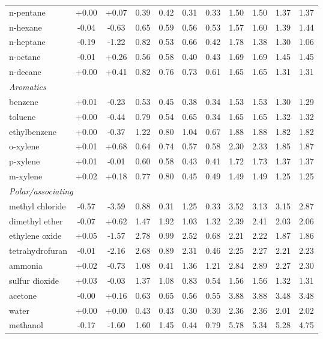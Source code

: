\begin{table}[H]
\begin{tabular}{lcccccccccc}
n-pentane & +0.00 & +0.07 & 0.39 & 0.42 & 0.31 & 0.33 & 1.50 & 1.50 & 1.37 & 1.37 \\
n-hexane & -0.04 & -0.63 & 0.65 & 0.59 & 0.56 & 0.53 & 1.57 & 1.60 & 1.39 & 1.44 \\
n-heptane & -0.19 & -1.22 & 0.82 & 0.53 & 0.66 & 0.42 & 1.78 & 1.38 & 1.30 & 1.06 \\
n-octane & -0.01 & +0.26 & 0.56 & 0.58 & 0.40 & 0.43 & 1.69 & 1.69 & 1.45 & 1.45 \\
n-decane & +0.00 & +0.41 & 0.82 & 0.76 & 0.73 & 0.61 & 1.65 & 1.65 & 1.31 & 1.31 \\
\multicolumn{11}{l}{\emph{Aromatics}} \\
benzene & +0.01 & -0.23 & 0.53 & 0.45 & 0.38 & 0.34 & 1.53 & 1.53 & 1.30 & 1.29 \\
toluene & +0.00 & -0.44 & 0.79 & 0.54 & 0.65 & 0.34 & 1.65 & 1.65 & 1.32 & 1.32 \\
ethylbenzene & +0.00 & -0.37 & 1.22 & 0.80 & 1.04 & 0.67 & 1.88 & 1.88 & 1.82 & 1.82 \\
o-xylene & +0.01 & +0.68 & 0.64 & 0.74 & 0.57 & 0.58 & 2.30 & 2.33 & 1.85 & 1.87 \\
p-xylene & +0.01 & -0.01 & 0.60 & 0.58 & 0.43 & 0.41 & 1.72 & 1.73 & 1.37 & 1.37 \\
m-xylene & +0.02 & +0.18 & 0.77 & 0.80 & 0.45 & 0.49 & 1.49 & 1.49 & 1.25 & 1.25 \\
\multicolumn{11}{l}{\emph{Polar/associating}} \\
methyl chloride & -0.57 & -3.59 & 0.88 & 0.31 & 1.25 & 0.33 & 3.52 & 3.13 & 3.15 & 2.87 \\
dimethyl ether & -0.07 & +0.62 & 1.47 & 1.92 & 1.03 & 1.32 & 2.39 & 2.41 & 2.03 & 2.06 \\
ethylene oxide & +0.05 & -1.57 & 2.78 & 0.99 & 2.52 & 0.68 & 2.21 & 2.22 & 1.87 & 1.86 \\
tetrahydrofuran & -0.01 & -2.16 & 2.68 & 0.89 & 2.31 & 0.46 & 2.25 & 2.27 & 2.21 & 2.23 \\
ammonia & +0.02 & -0.73 & 1.08 & 0.41 & 1.36 & 1.21 & 2.84 & 2.89 & 2.27 & 2.30 \\
sulfur dioxide & +0.03 & -0.03 & 1.37 & 1.08 & 0.83 & 0.54 & 1.56 & 1.56 & 1.32 & 1.31 \\
acetone & -0.00 & +0.16 & 0.63 & 0.65 & 0.56 & 0.55 & 3.88 & 3.88 & 3.48 & 3.48 \\
water & +0.00 & +0.00 & 0.43 & 0.43 & 0.30 & 0.30 & 2.36 & 2.36 & 2.01 & 2.02 \\
methanol & -0.17 & -1.60 & 1.60 & 1.45 & 0.44 & 0.79 & 5.78 & 5.34 & 5.28 & 4.75 \\

\end{tabular}
\end{table}

